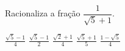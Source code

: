 Racionaliza a fração $\dfrac{1}{\sqrt{5}+1}$.

$\frac{\sqrt{5}-1}{4}$
$\frac{\sqrt{5}-1}{2}$
$\frac{\sqrt{2}+1}{4}$
$\frac{\sqrt{5}+1}{5}$
$\frac{1-\sqrt{5}}{4}$


